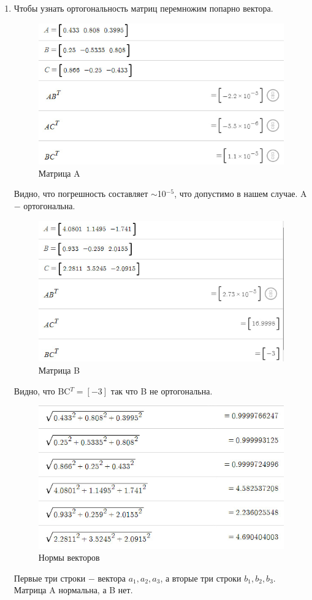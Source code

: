 \begin{enumerate}
    \item 
        Чтобы узнать ортогональность матриц перемножим попарно вектора.\\
        \begin{figure}[H]
            \centering
            \includegraphics[width=0.6\linewidth]{2_A_orto.png}
            \caption{Матрица A} 
        \end{figure}
        Видно, что погрешность составляет $\sim$10$^{-5}$, что допустимо в нашем случае. A $-$ ортогональна.\\
        \begin{figure}[H]
            \centering
            \includegraphics[width=0.6\linewidth]{2_B_orto.png}
            \caption{Матрица B}
        \end{figure}
        Видно, что BC$^T = [-3]$ так что B не ортогональна.\\
        \begin{figure}[H]
            \centering
            \includegraphics[width=0.6\linewidth]{2_AB_norm.png}
            \caption{Нормы векторов}
        \end{figure}
        Первые три строки $-$ вектора $a_1, a_2, a_3$, а вторые три строки $b_1, b_2, b_3$. Матрица A нормальна, а B нет.\\
        

\end{enumerate}
